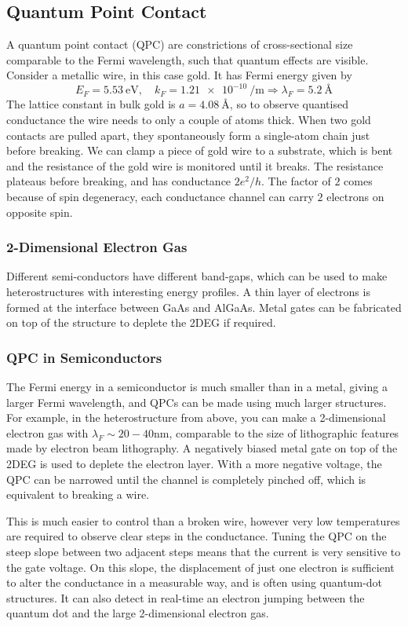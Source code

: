 \documentclass{article}
\begin{document}
\subsection{Quantum Point Contact}
A quantum point contact (QPC) are constrictions of cross-sectional size comparable to the Fermi wavelength, such that quantum effects are visible. Consider a metallic wire, in this case gold. It has Fermi energy given by 
\[
    E_F=\SI{5.53}{\electronvolt}, \quad k_F=\SI{1.21e-10}{\per\metre}\Rightarrow\lambda _F=\SI{5.2}{\angstrom}
\]
The lattice constant in bulk gold is $a=\SI{4.08}{\angstrom}$, so to observe quantised conductance the wire needs to only a couple of atoms thick. When two gold contacts are pulled apart, they spontaneously form a single-atom chain just before breaking. We can clamp a piece of gold wire to a substrate, which is bent and the resistance of the gold wire is monitored until it breaks. The resistance plateaus before breaking, and has conductance $2e^2/h$. The factor of $2$ comes because of spin degeneracy, each conductance channel can carry $2$ electrons on opposite spin.

\subsubsection{2-Dimensional Electron Gas}
Different semi-conductors have different band-gaps, which can be used to make heterostructures with interesting energy profiles. A thin layer of electrons is formed at the interface between GaAs and AlGaAs. Metal gates can be fabricated on top of the structure to deplete the 2DEG if required.

\subsubsection{QPC in Semiconductors}
The Fermi energy in a semiconductor is much smaller than in a metal, giving a larger Fermi wavelength, and QPCs can be made using much larger structures. For example, in the heterostructure from above, you can make a 2-dimensional electron gas with $\lambda _F\sim 20-40 \unit{\nm}$, comparable to the size of lithographic features made by electron beam lithography. A negatively biased metal gate on top of the 2DEG is used to deplete the electron layer. With a more negative voltage, the QPC can be narrowed until the channel is completely pinched off, which is equivalent to breaking a wire.

This is much easier to control than a broken wire, however very low temperatures are required to observe clear steps in the conductance. Tuning the QPC on the steep slope between two adjacent steps means that the current is very sensitive to the gate voltage. On this slope, the displacement of just one electron is sufficient to alter the conductance in a measurable way, and is often using quantum-dot structures. It can also detect in real-time an electron jumping between the quantum dot and the large 2-dimensional electron gas.
\end{document}

